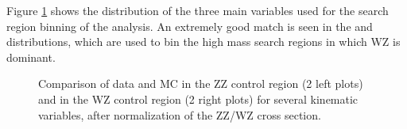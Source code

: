 Figure \ref{fig:validation} shows the distribution of the three main variables used for the search region binning of the analysis. An extremely good match is seen in the \mmin  and \mtmin  distributions, which are used to bin the high mass search regions in which WZ is dominant.


\begin{figure}[h]
\noindent
{}
\caption{Comparison of data and MC in the ZZ control region (2 left
  plots) and in the WZ control region (2 right plots) for several kinematic variables, after normalization of the ZZ/WZ cross section.} 
\label{fig:validation}
\end{figure}


